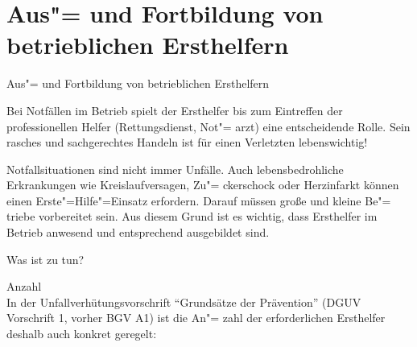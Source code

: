 \documentclass[a4paper]{infoblatt}
\begin{document}
\fusszeile
{}




\vspace*{3cm}

\section*{Aus"= und Fortbildung von betrieblichen Ersthelfern}
\normalsize    Aus"= und Fortbildung von betrieblichen Ersthelfern

 Bei Notfällen im Betrieb spielt der Ersthelfer bis zum Eintreffen der professionellen Helfer (Rettungsdienst, Not"= arzt) eine entscheidende Rolle. Sein rasches und sachgerechtes Handeln ist für einen Verletzten lebenswichtig!

 Notfallsituationen sind nicht immer Unfälle. Auch lebensbedrohliche Erkrankungen wie Kreislaufversagen, Zu"= ckerschock oder Herzinfarkt können einen Erste"=Hilfe"=Einsatz erfordern. Darauf müssen große und kleine Be"= triebe vorbereitet sein. Aus diesem Grund ist es wichtig, dass Ersthelfer im Betrieb anwesend und entsprechend ausgebildet sind.

 Was ist zu tun?

 Anzahl\\
 In der Unfallverhütungsvorschrift "`Grundsätze der Prävention"' (DGUV Vorschrift 1, vorher BGV A1) ist die An"= zahl der erforderlichen Ersthelfer deshalb auch konkret geregelt:
\end{document}
